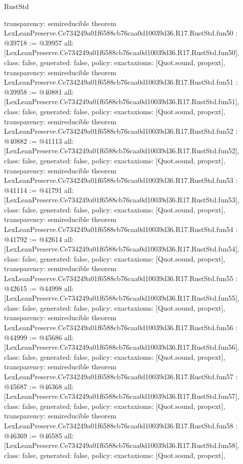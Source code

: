 \begin{lexlean}{RustStd}
\begin{coremodule}
{  transparency: semireducible
}
theorem LexLeanPreserve.Ce734249a01f6588cb76caa0d10039d36.R17.RustStd.fun50 : @39718 := @39957 {
  all: [LexLeanPreserve.Ce734249a01f6588cb76caa0d10039d36.R17.RustStd.fun50],
  class: false,
  generated: false,
  policy: exact{axioms: [Quot.sound, propext]},
  transparency: semireducible
}
theorem LexLeanPreserve.Ce734249a01f6588cb76caa0d10039d36.R17.RustStd.fun51 : @39958 := @40881 {
  all: [LexLeanPreserve.Ce734249a01f6588cb76caa0d10039d36.R17.RustStd.fun51],
  class: false,
  generated: false,
  policy: exact{axioms: [Quot.sound, propext]},
  transparency: semireducible
}
theorem LexLeanPreserve.Ce734249a01f6588cb76caa0d10039d36.R17.RustStd.fun52 : @40882 := @41113 {
  all: [LexLeanPreserve.Ce734249a01f6588cb76caa0d10039d36.R17.RustStd.fun52],
  class: false,
  generated: false,
  policy: exact{axioms: [Quot.sound, propext]},
  transparency: semireducible
}
theorem LexLeanPreserve.Ce734249a01f6588cb76caa0d10039d36.R17.RustStd.fun53 : @41114 := @41791 {
  all: [LexLeanPreserve.Ce734249a01f6588cb76caa0d10039d36.R17.RustStd.fun53],
  class: false,
  generated: false,
  policy: exact{axioms: [Quot.sound, propext]},
  transparency: semireducible
}
theorem LexLeanPreserve.Ce734249a01f6588cb76caa0d10039d36.R17.RustStd.fun54 : @41792 := @42614 {
  all: [LexLeanPreserve.Ce734249a01f6588cb76caa0d10039d36.R17.RustStd.fun54],
  class: false,
  generated: false,
  policy: exact{axioms: [Quot.sound, propext]},
  transparency: semireducible
}
theorem LexLeanPreserve.Ce734249a01f6588cb76caa0d10039d36.R17.RustStd.fun55 : @42615 := @44998 {
  all: [LexLeanPreserve.Ce734249a01f6588cb76caa0d10039d36.R17.RustStd.fun55],
  class: false,
  generated: false,
  policy: exact{axioms: [Quot.sound, propext]},
  transparency: semireducible
}
theorem LexLeanPreserve.Ce734249a01f6588cb76caa0d10039d36.R17.RustStd.fun56 : @44999 := @45686 {
  all: [LexLeanPreserve.Ce734249a01f6588cb76caa0d10039d36.R17.RustStd.fun56],
  class: false,
  generated: false,
  policy: exact{axioms: [Quot.sound, propext]},
  transparency: semireducible
}
theorem LexLeanPreserve.Ce734249a01f6588cb76caa0d10039d36.R17.RustStd.fun57 : @45687 := @46368 {
  all: [LexLeanPreserve.Ce734249a01f6588cb76caa0d10039d36.R17.RustStd.fun57],
  class: false,
  generated: false,
  policy: exact{axioms: [Quot.sound, propext]},
  transparency: semireducible
}
theorem LexLeanPreserve.Ce734249a01f6588cb76caa0d10039d36.R17.RustStd.fun58 : @46369 := @46585 {
  all: [LexLeanPreserve.Ce734249a01f6588cb76caa0d10039d36.R17.RustStd.fun58],
  class: false,
  generated: false,
  policy: exact{axioms: [Quot.sound, propext]},
}
\end{coremodule}
\end{lexlean}
